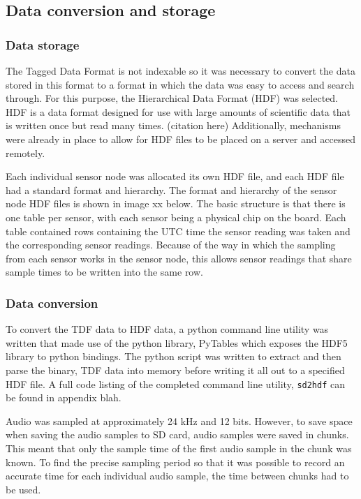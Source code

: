 \subsection{Data conversion and storage}

\subsubsection{Data storage}
The Tagged Data Format is not indexable so it was necessary to convert the data stored in this format to a format in which the data was easy to access and search through. For this purpose, the Hierarchical Data Format (HDF) was selected. HDF is a data format designed for use with large amounts of scientific data that is written once but read many times. (citation here) Additionally, mechanisms were already in place to allow for HDF files to be placed on a server and accessed remotely. 

Each individual sensor node was allocated its own HDF file, and each HDF file had a standard format and hierarchy. The format and hierarchy of the sensor node HDF files is shown in image xx below. The basic structure is that there is one table per sensor, with each sensor being a physical chip on the board. Each table contained rows containing the UTC time the sensor reading was taken and the corresponding sensor readings. Because of the way in which the sampling from each sensor works in the sensor node, this allows sensor readings that share sample times to be written into the same row.  

\subsubsection{Data conversion}
To convert the TDF data to HDF data, a python command line utility was written that made use of the python library, PyTables which exposes the HDF5 library to python bindings. The python script was written to extract and then parse the binary, TDF data into memory before writing it all out to a specified HDF file. A full code listing of the completed command line utility, \texttt{sd2hdf} can be found in appendix blah. 

Audio was sampled at approximately 24 kHz and 12 bits. However, to save space when saving the audio samples to SD card, audio samples were saved in chunks. This meant that only the sample time of the first audio sample in the chunk was known. To find the precise sampling period so that it was possible to record an accurate time for each individual audio sample, the time between chunks had to be used.  

